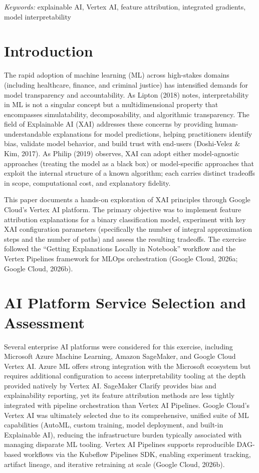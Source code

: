 \documentclass[12pt,letterpaper]{article}
\begin{document}
\vspace{6pt}
\noindent\textit{Keywords:} explainable AI, Vertex AI, feature attribution,
integrated gradients, model interpretability

\section{Introduction}

The rapid adoption of machine learning (ML) across high-stakes domains (including
healthcare, finance, and criminal justice) has intensified demands for model
transparency and accountability. As Lipton (2018) notes, interpretability in ML
is not a singular concept but a multidimensional property that encompasses
simulatability, decomposability, and algorithmic transparency. The field of
Explainable AI (XAI) addresses these concerns by providing human-understandable
explanations for model predictions, helping practitioners identify bias, validate
model behavior, and build trust with end-users (Doshi-Velez \& Kim, 2017). As
Philip (2019) observes, XAI can adopt either model-agnostic approaches (treating
the model as a black box) or model-specific approaches that exploit the internal
structure of a known algorithm; each carries distinct tradeoffs in scope,
computational cost, and explanatory fidelity.

This paper documents a hands-on exploration of XAI principles through Google
Cloud's Vertex AI platform. The primary objective was to implement feature
attribution explanations for a binary classification model, experiment with key
XAI configuration parameters (specifically the number of integral approximation
steps and the number of paths) and assess the resulting tradeoffs. The exercise
followed the ``Getting Explanations Locally in Notebook'' workflow and the Vertex
Pipelines framework for MLOps orchestration (Google Cloud, 2026a; Google Cloud,
2026b).

\section{AI Platform Service Selection and Assessment}

Several enterprise AI platforms were considered for this exercise, including
Microsoft Azure Machine Learning, Amazon SageMaker, and Google Cloud Vertex AI.
Azure ML offers strong integration with the Microsoft ecosystem but requires
additional configuration to access interpretability tooling at the depth provided
natively by Vertex AI. SageMaker Clarify provides bias and explainability
reporting, yet its feature attribution methods are less tightly integrated with
pipeline orchestration than Vertex AI Pipelines. Google Cloud's Vertex AI was
ultimately selected due to its comprehensive, unified suite of ML capabilities
(AutoML, custom training, model deployment, and built-in Explainable AI), reducing
the infrastructure burden typically associated with managing disparate ML tooling.
Vertex AI Pipelines supports reproducible DAG-based workflows via the Kubeflow
Pipelines SDK, enabling experiment tracking, artifact lineage, and iterative
retraining at scale (Google Cloud, 2026b).
\end{document}
